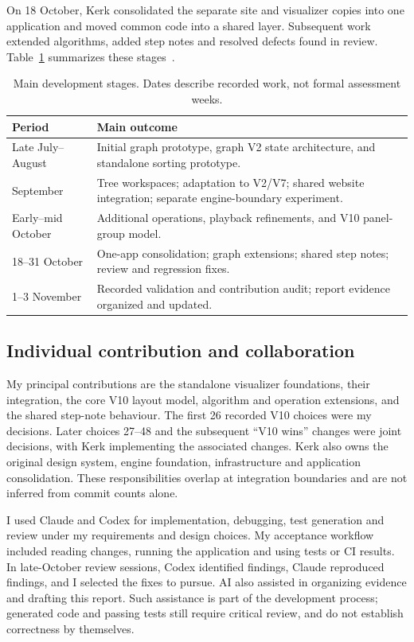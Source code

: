 \documentclass[11pt,a4paper]{article}
\begin{document}
On 18 October, Kerk consolidated the separate site and visualizer copies into one application and moved common code into a shared layer. Subsequent work extended algorithms, added step notes and resolved defects found in review. Table~\ref{tab:timeline} summarizes these stages~\cite{evidence,architecture}.

\begin{table}[H]\small\centering
\caption{Main development stages. Dates describe recorded work, not formal assessment weeks.}\label{tab:timeline}
\begin{tabularx}{\linewidth}{@{}p{27mm}X@{}}\toprule
Period & Main outcome\\\midrule
Late July--August & Initial graph prototype, graph V2 state architecture, and standalone sorting prototype.\\
September & Tree workspaces; adaptation to V2/V7; shared website integration; separate engine-boundary experiment.\\
Early--mid October & Additional operations, playback refinements, and V10 panel-group model.\\
18--31 October & One-app consolidation; graph extensions; shared step notes; review and regression fixes.\\
1--3 November & Recorded validation and contribution audit; report evidence organized and updated.\\\bottomrule
\end{tabularx}
\end{table}

\subsection{Individual contribution and collaboration}
My principal contributions are the standalone visualizer foundations, their integration, the core V10 layout model, algorithm and operation extensions, and the shared step-note behaviour. The first 26 recorded V10 choices were my decisions. Later choices 27--48 and the subsequent ``V10 wins'' changes were joint decisions, with Kerk implementing the associated changes. Kerk also owns the original design system, engine foundation, infrastructure and application consolidation. These responsibilities overlap at integration boundaries and are not inferred from commit counts alone.

I used Claude and Codex for implementation, debugging, test generation and review under my requirements and design choices. My acceptance workflow included reading changes, running the application and using tests or CI results. In late-October review sessions, Codex identified findings, Claude reproduced findings, and I selected the fixes to pursue. AI also assisted in organizing evidence and drafting this report. Such assistance is part of the development process; generated code and passing tests still require critical review, and do not establish correctness by themselves.
\end{document}
